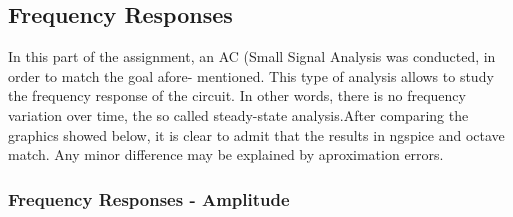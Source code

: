 \subsection{Frequency Responses}

In this part of the assignment, an AC (Small Signal Analysis was conducted, in order to match the goal afore-
mentioned. This type of analysis allows to study the frequency response of the circuit. In other words, there
is no frequency variation over time, the so called steady-state analysis.After comparing the graphics showed
below, it is clear to admit that the results in ngspice and octave match. Any minor difference may be explained
by aproximation errors.

\subsubsection{Frequency Responses - Amplitude}



